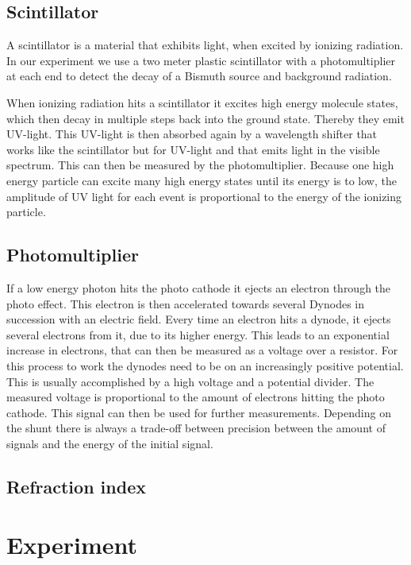 \documentclass[]{article}
\begin{document}
\subsection{Scintillator}\label{scintillator}
A scintillator is a material that exhibits light, when excited by ionizing radiation. In our experiment we use a two meter plastic scintillator with a photomultiplier at each end to detect the decay of a Bismuth source and background radiation.

When ionizing radiation hits a scintillator it excites high energy molecule states, which then decay in multiple steps back into the ground state. Thereby they emit UV-light. This UV-light is then absorbed again by a wavelength shifter that works like the scintillator but for UV-light and that emits light in the visible spectrum. This can then be measured by the photomultiplier. Because one high energy particle can excite many high energy states until its energy is to low, the amplitude of UV light for each event is proportional to the energy of the ionizing particle.
\subsection{Photomultiplier}
If a low energy photon hits the photo cathode it ejects an electron through the photo effect. This electron is then accelerated towards several Dynodes in succession with an electric field. Every time an electron hits a dynode, it ejects several electrons from it, due to its higher energy. This leads to an exponential increase in electrons, that can then be measured as a voltage over a resistor. For this process to work the dynodes need to be on an increasingly positive potential. This is usually accomplished by a high voltage and a potential divider. 
The measured voltage is proportional to the amount of electrons hitting the photo cathode. This signal can then be used for further measurements. Depending on the shunt there is always a trade-off between precision between the amount of signals and the energy of the initial signal. 
\subsection{Refraction index}\label{refrac index}


\newpage
\section{Experiment}
\end{document}
